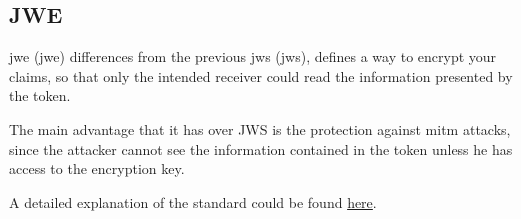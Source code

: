\subsection{JWE}
\acs{jwe} (\acl{jwe}) differences from the previous \acs{jws} (\acl{jws}),
defines a way to encrypt your claims, so that only the intended
receiver could read the information presented by the token.

The main advantage that it has over JWS is the protection against \acs{mitm} attacks,
since the attacker cannot see the information contained in the token unless he
has access to the encryption key.

A detailed explanation of the standard could be found
\href{https://tools.ietf.org/html/draft-ietf-jose-json-web-signature-41}{here}.


